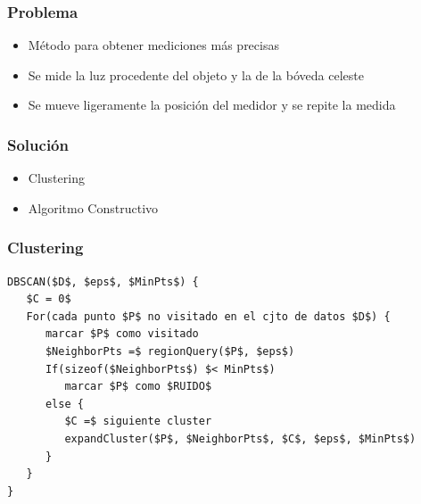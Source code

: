 \begin{frame}
    \frametitle{Problema}
		\begin{itemize}
		\item Método para obtener mediciones más precisas
		\item Se mide la luz procedente del objeto y la de la bóveda celeste
		\item Se mueve ligeramente la posición del medidor y se repite la medida
		\end{itemize}
    \endblock{}
\end{frame}

\begin{frame}
    \frametitle{Solución}
    \begin{itemize}
		\item Clustering
    \item Algoritmo Constructivo
    \end{itemize}
    \endblock{}
\end{frame}

\begin{frame}[fragile]
\frametitle{Clustering}
\endblock{}
\begin{lstlisting}[linewidth=\linewidth, mathescape,
numbers=none,basicstyle=\ttfamily\footnotesize]
DBSCAN($D$, $eps$, $MinPts$) {
   $C = 0$
   For(cada punto $P$ no visitado en el cjto de datos $D$) {
      marcar $P$ como visitado
      $NeighborPts =$ regionQuery($P$, $eps$)
      If(sizeof($NeighborPts$) $< MinPts$)
         marcar $P$ como $RUIDO$
      else {
         $C =$ siguiente cluster
         expandCluster($P$, $NeighborPts$, $C$, $eps$, $MinPts$)
      }   
   }   
}
\end{lstlisting}
\end{frame}

